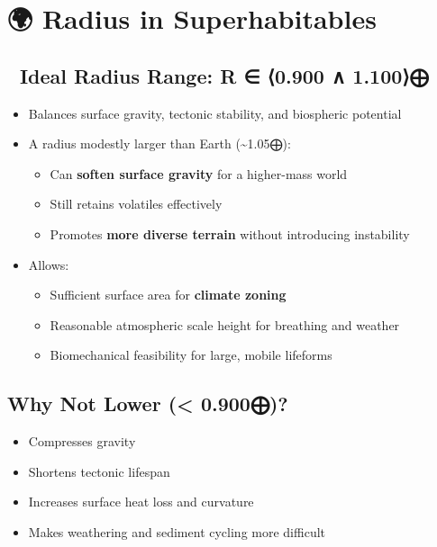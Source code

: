 \documentclass[
  letterpaper,
]{book}
\providecommand{\tightlist}{%
  \setlength{\itemsep}{0pt}\setlength{\parskip}{0pt}}
\begin{document}
\section{🌍 Radius in Superhabitables}\label{radius-in-superhabitables}

\subsection{🧭 Ideal Radius Range: R ∈ ⟨0.900 ∧
1.100⟩⨁}\label{ideal-radius-range-r-0.900-1.100}

\begin{itemize}
\tightlist
\item
  Balances surface gravity, tectonic stability, and biospheric potential
\item
  A radius modestly larger than Earth (\textasciitilde1.05⨁):

  \begin{itemize}
  \tightlist
  \item
    Can \textbf{soften surface gravity} for a higher-mass world
  \item
    Still retains volatiles effectively
  \item
    Promotes \textbf{more diverse terrain} without introducing
    instability
  \end{itemize}
\item
  Allows:

  \begin{itemize}
  \tightlist
  \item
    Sufficient surface area for \textbf{climate zoning}
  \item
    Reasonable atmospheric scale height for breathing and weather
  \item
    Biomechanical feasibility for large, mobile lifeforms
  \end{itemize}
\end{itemize}

\subsection{Why Not Lower (\textless{}
0.900⨁)?}\label{why-not-lower-0.900}

\begin{itemize}
\tightlist
\item
  Compresses gravity
\item
  Shortens tectonic lifespan
\item
  Increases surface heat loss and curvature
\item
  Makes weathering and sediment cycling more difficult
\end{itemize}
\end{document}
